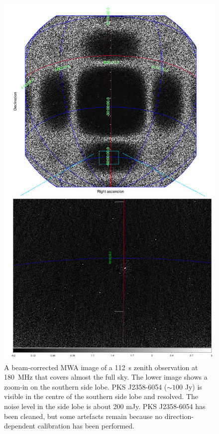 \documentclass[useAMS,usenatbib]{mn2e}
\begin{document}
\begin{figure}
\begin{center}
\includegraphics[width=13.5cm]{img/fullsky-together}
\caption{A beam-corrected MWA image of a 112~s zenith observation at 180~MHz that covers almost the full sky. The lower image shows a zoom-in on the southern side lobe. PKS J2358-6054 ($\sim100$ Jy) is visible in the centre of the southern side lobe and resolved. The noise level in the side lobe is about 200 mJy. PKS J2358-6054 has been cleaned, but some artefacts remain because no direction-dependent calibration has been performed.}
\label{fig:full-sky-example}
\end{center}
\end{figure}
\end{document}
